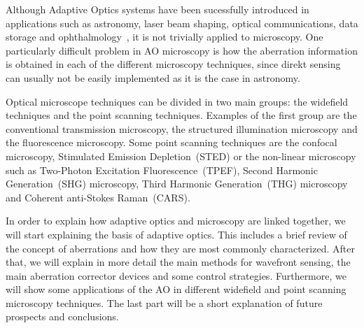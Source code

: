 Although Adaptive Optics systems have been sucessfully introduced in applications such as astronomy, laser beam shaping, optical communications, data storage and ophthalmology~\cite{AOM_biomedical}, it is not trivially applied to microscopy. One particularly difficult problem in AO microscopy is how the aberration information is obtained in each of the different microscopy techniques, since direkt sensing can usually not be easily implemented as it is the case in astronomy.

Optical microscope techniques can be divided in two main groups: the widefield techniques and the point scanning techniques. Examples of the first group are the conventional transmission microscopy, the structured illumination microscopy and the fluorescence microscopy. Some point scanning techniques are the confocal microscopy, Stimulated Emission Depletion~(STED) or the non-linear microscopy such as Two-Photon Excitation Fluorescence~(TPEF), Second Harmonic Generation~(SHG) microscopy, Third Harmonic Generation~(THG) microscopy and Coherent anti-Stokes Raman~(CARS). \newline

In order to explain how adaptive optics and microscopy are linked together, we will start explaining the basis of adaptive optics. This includes a brief review of the concept of aberrations and how they are most commonly characterized. After that, we will explain in more detail the main methods for wavefront sensing, the main aberration corrector devices and some control strategies. Furthermore, we will show some applications of the AO in different widefield and point scanning microscopy techniques. The last part will be a short explanation of future prospects and conclusions.       

